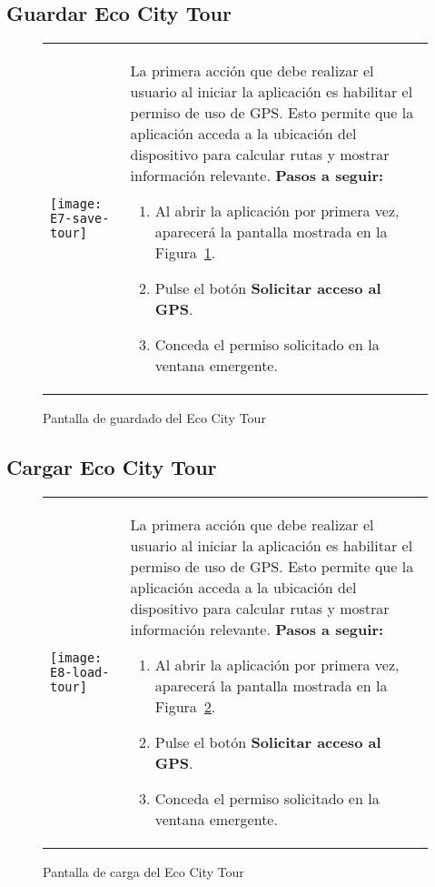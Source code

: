 \subsection{Guardar Eco City Tour}
\begin{figure}[h!]
	\centering
	\begin{tabular}{m{} m{}}
		\texttt{[image: E7-save-tour]} & 
		\vspace{-10pt}
		
		La primera acción que debe realizar el usuario al iniciar la aplicación es habilitar el permiso de uso de GPS. Esto permite que la aplicación acceda a la ubicación del dispositivo para calcular rutas y mostrar información relevante.
		\textbf{Pasos a seguir:}
		\begin{enumerate}
			\item Al abrir la aplicación por primera vez, aparecerá la pantalla mostrada en la Figura~\ref{fig:saveECT}.
			\item Pulse el botón \textbf{Solicitar acceso al GPS}.
			\item Conceda el permiso solicitado en la ventana emergente.
		\end{enumerate}		
	\end{tabular}
	\caption{Pantalla de guardado del Eco City Tour}
	\label{fig:saveECT}
\end{figure}

\subsection{Cargar Eco City Tour}
\begin{figure}[h!]
	\centering
	\begin{tabular}{m{} m{}}
		\texttt{[image: E8-load-tour]} & 
		\vspace{-10pt}
		
		La primera acción que debe realizar el usuario al iniciar la aplicación es habilitar el permiso de uso de GPS. Esto permite que la aplicación acceda a la ubicación del dispositivo para calcular rutas y mostrar información relevante.
		\textbf{Pasos a seguir:}
		\begin{enumerate}
			\item Al abrir la aplicación por primera vez, aparecerá la pantalla mostrada en la Figura~\ref{fig:loadECT}.
			\item Pulse el botón \textbf{Solicitar acceso al GPS}.
			\item Conceda el permiso solicitado en la ventana emergente.
		\end{enumerate}		
	\end{tabular}
	\caption{Pantalla de carga del Eco City Tour}
	\label{fig:loadECT}
\end{figure}

